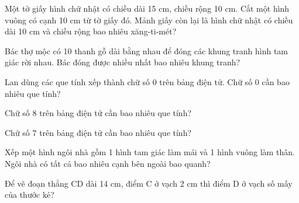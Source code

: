 \begin{ex}
Một tờ giấy hình chữ nhật có chiều dài 15 cm, chiều rộng 10 cm. Cắt một hình vuông có cạnh 10 cm từ tờ giấy đó. Mảnh giấy còn lại là hình chữ nhật có chiều dài 10 cm và chiều rộng bao nhiêu xăng-ti-mét?
\end{ex}

\begin{ex}
Bác thợ mộc có 10 thanh gỗ dài bằng nhau để đóng các khung tranh hình tam giác rời nhau. Bác đóng được nhiều nhất bao nhiêu khung tranh?
\end{ex}

\begin{ex}
Lan dùng các que tính xếp thành chữ số 0 trên bảng điện tử. Chữ số 0 cần bao nhiêu que tính?
\end{ex}

\begin{ex}
Chữ số 8 trên bảng điện tử cần bao nhiêu que tính?
\end{ex}

\begin{ex}
Chữ số 7 trên bảng điện tử cần bao nhiêu que tính?
\end{ex}

\begin{ex}
Xếp một hình ngôi nhà gồm 1 hình tam giác làm mái và 1 hình vuông làm thân. Ngôi nhà có tất cả bao nhiêu cạnh bên ngoài bao quanh?
\end{ex}

\begin{ex}
Để vẽ đoạn thẳng CD dài 14 cm, điểm C ở vạch 2 cm thì điểm D ở vạch số mấy của thước kẻ?
\end{ex}
